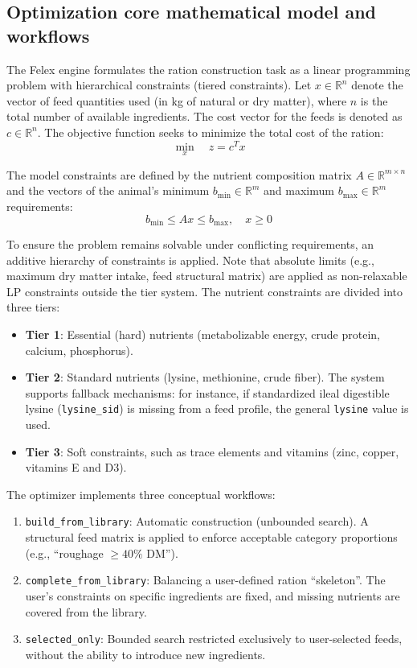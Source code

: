 \documentclass[a4paper,fleqn]{cas-sc}
\begin{document}
\subsection{Optimization core mathematical model and workflows}\label{subsec:optimization}

The Felex engine formulates the ration construction task as a linear programming problem with hierarchical constraints (tiered constraints). Let $x \in \mathbb{R}^n$ denote the vector of feed quantities used (in kg of natural or dry matter), where $n$ is the total number of available ingredients. The cost vector for the feeds is denoted as $c \in \mathbb{R}^n$. The objective function seeks to minimize the total cost of the ration:
\begin{equation}
\min_{x} \quad z = c^T x
\end{equation}

The model constraints are defined by the nutrient composition matrix $A \in \mathbb{R}^{m \times n}$ and the vectors of the animal's minimum $b_{\min} \in \mathbb{R}^m$ and maximum $b_{\max} \in \mathbb{R}^m$ requirements:
\begin{equation}
b_{\min} \leq A x \leq b_{\max}, \quad x \geq 0
\end{equation}

To ensure the problem remains solvable under conflicting requirements, an additive hierarchy of constraints is applied. Note that absolute limits (e.g., maximum dry matter intake, feed structural matrix) are applied as non-relaxable LP constraints outside the tier system. The nutrient constraints are divided into three tiers:
\begin{itemize}
    \item \textbf{Tier 1}: Essential (hard) nutrients (metabolizable energy, crude protein, calcium, phosphorus).
    \item \textbf{Tier 2}: Standard nutrients (lysine, methionine, crude fiber). The system supports fallback mechanisms: for instance, if standardized ileal digestible lysine (\texttt{lysine\_sid}) is missing from a feed profile, the general \texttt{lysine} value is used.
    \item \textbf{Tier 3}: Soft constraints, such as trace elements and vitamins (zinc, copper, vitamins E and D3).
\end{itemize}

The optimizer implements three conceptual workflows:
\begin{enumerate}
    \item \texttt{build\_from\_library}: Automatic construction (unbounded search). A structural feed matrix is applied to enforce acceptable category proportions (e.g., ``roughage $\geq 40\%$ DM'').
    \item \texttt{complete\_from\_library}: Balancing a user-defined ration ``skeleton''. The user's constraints on specific ingredients are fixed, and missing nutrients are covered from the library.
    \item \texttt{selected\_only}: Bounded search restricted exclusively to user-selected feeds, without the ability to introduce new ingredients.
\end{enumerate}
\end{document}
